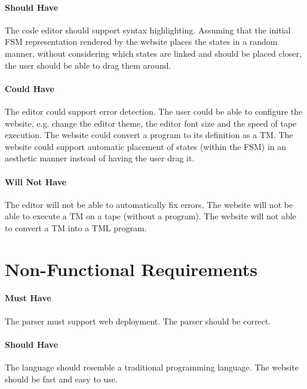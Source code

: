 \paragraph{Should Have} The code editor should support syntax highlighting. Assuming that the initial FSM representation rendered by the website places the states in a random manner, without considering which states are linked and should be placed closer, the user should be able to drag them around.

\paragraph{Could Have} The editor could support error detection. The user could be able to configure the website, e.g. change the editor theme, the editor font size and the speed of tape execution. The website could convert a program to its definition as a TM. The website could support automatic placement of states (within the FSM) in an aesthetic manner instead of having the user drag it.

\paragraph{Will Not Have} The editor will not be able to automatically fix errors. The website will not be able to execute a TM on a tape (without a program). The website will not able to convert a TM into a TML program.

\section{Non-Functional Requirements}
\paragraph{Must Have} The parser must support web deployment. The parser should be correct.

\paragraph{Should Have} The language should resemble a traditional programming language. The website should be fast and easy to use.



